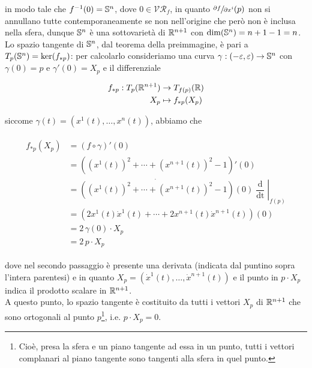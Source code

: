 in modo tale che $ f^{-1}(0) = \S^{n} $, dove $ 0 \in \mathcal{VR}_{f} $, in quanto $ \sfrac{\partial f}{\partial x^{i}} (p) $ non si annullano tutte contemporaneamente se non nell'origine che però non è inclusa nella sfera, dunque $ \S^{n} $ è una sottovarietà di $ \R^{n+1} $ con $ \dim(\S^{n}) = n+1-1 = n $.\\
Lo spazio tangente di $ \S^{n} $, dal teorema della preimmagine, è pari a $ T_{p}(\S^{n}) = \ker(f_{*p}) $: per calcolarlo consideriamo una curva $ \gamma : (-\varepsilon,\varepsilon) \to \S^{n} $ con $ \gamma(0) = p $ e $ \gamma'(0) = X_{p} $ e il differenziale

\begin{align}
	\begin{split}
		f_{*p} : T_{p}(\R^{n+1}) &\to T_{f(p)}(\R)\\
		X_{p} &\mapsto f_{*p}(X_{p})
	\end{split}
\end{align}

siccome $ \gamma(t) = (x^{1}(t),\dots,x^{n}(t)) $, abbiamo che

\begin{align}
	\begin{split}
		f_{*p}(X_{p}) &= (f \circ \gamma)'(0)\\
		&= ((x^{1}(t))^{2} + \cdots + (x^{n+1}(t))^{2} - 1)'(0)\\
		&= \dot{((x^{1}(t))^{2} + \cdots + (x^{n+1}(t))^{2} - 1)}(0) \left. \dfrac{\operatorname{d}}{\operatorname{dt}} \right|_{f(p)}\\
		&= (2 x^{1}(t) \dot{x}^{1}(t) + \cdots + 2 x^{n+1}(t) \dot{x}^{n+1}(t))(0)\\
		&= 2 \, \gamma(0) \cdot X_{p}\\
		&= 2 \, p \cdot X_{p}
	\end{split}
\end{align}

dove nel secondo passaggio è presente una derivata (indicata dal puntino sopra l'intera parentesi) e in quanto $ X_{p} = (\dot{x}^{1}(t),\dots,\dot{x}^{n+1}(t)) $ e il punto in $ p \cdot X_{p} $ indica il prodotto scalare in $ \R^{n+1} $.\\
A questo punto, lo spazio tangente è costituito da tutti i vettori $ X_{p} $ di $ \R^{n+1} $ che sono ortogonali al punto $ p $\footnote{%
	Cioè, presa la sfera e un piano tangente ad essa in un punto, tutti i vettori complanari al piano tangente sono tangenti alla sfera in quel punto.%
}, i.e. $ p \cdot X_{p} = 0 $.

